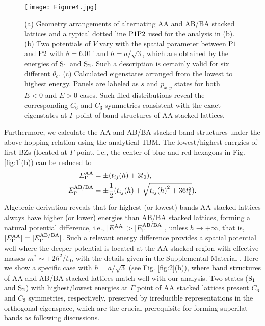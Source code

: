 \documentclass[%
reprint,
amsmath,amssymb,amsfonts
aps,
superscriptaddress,
prx
]{revtex4-1}
\begin{document}
\begin{figure*}
\texttt{[image: Figure4.jpg]}%
\caption{(a) Geometry arrangements of alternating AA and AB/BA stacked lattices and a typical dotted line ${\rm P1P2}$ used for the analysis in (b).
(b) Two potentials of $V$ vary with the spatial parameter between ${\rm P1}$ and ${\rm P2}$ with $\theta=6.01^{\circ}$ and $h=a/\sqrt{3}$, which are obtained by the energies of ${\rm S_1}$ and ${\rm S_2}$. 
Such a description is certainly valid for six different $\theta_c$. 
(c) Calculated eigenstates arranged from the lowest to highest energy. Panels are labeled as $s$ and $p_{x,y}$ states for both $E<0$ and $E>0$ cases. Such filed distributions reveal the corresponding $C_6$ and $C_3$ symmetries consistent with the exact eigenstates at $\Gamma$ point of band structures of AA stacked lattices.} 
\label{fig:4}
\end{figure*}%
Furthermore, we calculate the AA and AB/BA stacked band structures under the above hopping relation using the analytical TBM. The lowest/highest energies of first BZs (located at $\Gamma$ point, i.e., the center of blue and red hexagons in Fig. \ref{fig:1}(b)) can be reduced to 
\begin{equation}
\begin{split}
E_{\rm \Gamma}^{\rm AA}&=\pm(t_{ij}(h)+3t_0),\\ 
E_{\rm \Gamma}^{\rm AB/BA}&=\pm\frac{1}{2}(t_{ij}(h)+\sqrt{{t_{ij}(h)}^2+36t_0^2}).\\ 
\end{split}
\label{eq:3}
\end{equation}
Algebraic derivation reveals that for highest (or lowest) bands AA stacked lattices always have higher (or lower) energies than AB/BA stacked lattices, forming a natural potential difference, i.e., $|E_{\rm \Gamma}^{\rm AA}|>|E_{\rm \Gamma}^{\rm AB/BA}|$, unless $h\to+\infty$, that is, $|E_{\rm \Gamma}^{\rm AA}|=|E_{\rm \Gamma}^{\rm AB/BA}|$. Such a relevant energy difference provides a spatial potential well where the deeper potential is located at the AA stacked region with effective masses $m^{*}\sim\pm2\hbar^2/t_0$, with the details given in the Supplemental Material \cite{SM_file}. Here we show a specific case with $h=a/\sqrt{3}$ (see Fig. \ref{fig:2}(b)), where band structures of AA and AB/BA stacked lattices match well with our analysis. Two states (${\rm S_1}$ and ${\rm S_2}$) with highest/lowest energies at $\Gamma$ point of AA stacked lattices present $C_6$ and $C_3$ symmetries, respectively, preserved by irreducible representations in the orthogonal eigenspace, which are the crucial prerequisite for forming superflat bands as following discussions. 
\end{document}

